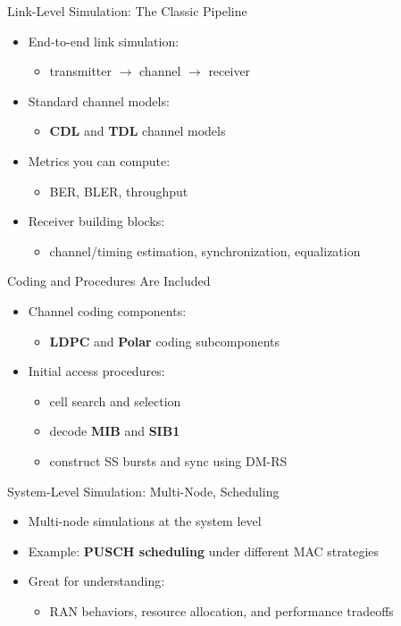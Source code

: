 \begin{frame}{Link-Level Simulation: The Classic Pipeline}
\begin{itemize}
  \item End-to-end link simulation:
  \begin{itemize}
    \item transmitter $\rightarrow$ channel $\rightarrow$ receiver
  \end{itemize}
  \item Standard channel models:
  \begin{itemize}
    \item \textbf{CDL} and \textbf{TDL} channel models
  \end{itemize}
  \item Metrics you can compute:
  \begin{itemize}
    \item BER, BLER, throughput
  \end{itemize}
  \item Receiver building blocks:
  \begin{itemize}
    \item channel/timing estimation, synchronization, equalization
  \end{itemize}
\end{itemize}
\end{frame}

\begin{frame}{Coding and Procedures Are Included}
\begin{itemize}
  \item Channel coding components:
  \begin{itemize}
    \item \textbf{LDPC} and \textbf{Polar} coding subcomponents
  \end{itemize}
  \item Initial access procedures:
  \begin{itemize}
    \item cell search and selection
    \item decode \textbf{MIB} and \textbf{SIB1}
    \item construct SS bursts and sync using DM-RS
  \end{itemize}
\end{itemize}
\end{frame}

\begin{frame}{System-Level Simulation: Multi-Node, Scheduling}
\begin{itemize}
  \item Multi-node simulations at the system level
  \item Example: \textbf{PUSCH scheduling} under different MAC strategies
  \item Great for understanding:
  \begin{itemize}
    \item RAN behaviors, resource allocation, and performance tradeoffs
  \end{itemize}
\end{itemize}
\end{frame}

